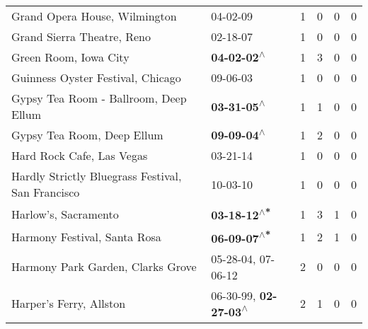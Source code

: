 \begin{supertabular}{p{0.4\textwidth}p{0.3\textwidth}p{0.05\textwidth}p{0.05\textwidth}p{0.05\textwidth}p{0.05\textwidth}}
                                                Grand Opera House, Wilmington &                                                                  04-02-09\textsuperscript{} &  1 &  0 &  0 &  0 \\
                                                   Grand Sierra Theatre, Reno &                                                                  02-18-07\textsuperscript{} &  1 &  0 &  0 &  0 \\
                                                        Green Room, Iowa City &                                                 \textbf{04-02-02\textsuperscript{$\wedge$}} &  1 &  3 &  0 &  0 \\
                                            Guinness Oyster Festival, Chicago &                                                                  09-06-03\textsuperscript{} &  1 &  0 &  0 &  0 \\
                                        Gypsy Tea Room - Ballroom, Deep Ellum &                                                 \textbf{03-31-05\textsuperscript{$\wedge$}} &  1 &  1 &  0 &  0 \\
                                                   Gypsy Tea Room, Deep Ellum &                                                 \textbf{09-09-04\textsuperscript{$\wedge$}} &  1 &  2 &  0 &  0 \\
                                                    Hard Rock Cafe, Las Vegas &                                                                  03-21-14\textsuperscript{} &  1 &  0 &  0 &  0 \\
                            Hardly Strictly Bluegrass Festival, San Francisco &                                                                  10-03-10\textsuperscript{} &  1 &  0 &  0 &  0 \\
                                                         Harlow's, Sacramento &                                                \textbf{03-18-12\textsuperscript{$\wedge$*}} &  1 &  3 &  1 &  0 \\
                                                 Harmony Festival, Santa Rosa &                                                \textbf{06-09-07\textsuperscript{$\wedge$*}} &  1 &  2 &  1 &  0 \\
                                            Harmony Park Garden, Clarks Grove &                                      05-28-04\textsuperscript{}, 07-06-12\textsuperscript{} &  2 &  0 &  0 &  0 \\
                                                      Harper's Ferry, Allston &                     06-30-99\textsuperscript{}, \textbf{02-27-03\textsuperscript{$\wedge$}} &  2 &  1 &  0 &  0 \\

\end{supertabular}
